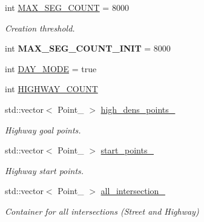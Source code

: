 \begin{DoxyCompactItemize}
\hypertarget{class_entity_container_aa30630d7b19fdf3eca17f07ef0d8ee28}{}\label{class_entity_container_aa30630d7b19fdf3eca17f07ef0d8ee28} 
int \hyperlink{class_entity_container_aa30630d7b19fdf3eca17f07ef0d8ee28}{M\+A\+X\+\_\+\+S\+E\+G\+\_\+\+C\+O\+U\+NT} = 8000
\begin{DoxyCompactList}\small\item\em Creation threshold. \end{DoxyCompactList}\item 
\hypertarget{class_entity_container_ac3fadec692c82ab047c12137e5c3938d}{}\label{class_entity_container_ac3fadec692c82ab047c12137e5c3938d} 
int {\bfseries M\+A\+X\+\_\+\+S\+E\+G\+\_\+\+C\+O\+U\+N\+T\+\_\+\+I\+N\+IT} = 8000
\item 
int \hyperlink{class_entity_container_a903b71e2c4be9c3e1d09f15e43535117}{D\+A\+Y\+\_\+\+M\+O\+DE} = true
\item 
int \hyperlink{class_entity_container_a9e2ee21384cc1ed4a2a74a2dbb57afa2}{H\+I\+G\+H\+W\+A\+Y\+\_\+\+C\+O\+U\+NT}
\item 
\hypertarget{class_entity_container_aef7e8c301071323d9931070e51404705}{}\label{class_entity_container_aef7e8c301071323d9931070e51404705} 
std\+::vector$<$ Point\+\_ $>$ \hyperlink{class_entity_container_aef7e8c301071323d9931070e51404705}{high\+\_\+dens\+\_\+points\+\_\+}
\begin{DoxyCompactList}\small\item\em Highway goal points. \end{DoxyCompactList}\item 
\hypertarget{class_entity_container_a40984f7d116b526a0bb6eeb987df4014}{}\label{class_entity_container_a40984f7d116b526a0bb6eeb987df4014} 
std\+::vector$<$ Point\+\_ $>$ \hyperlink{class_entity_container_a40984f7d116b526a0bb6eeb987df4014}{start\+\_\+points\+\_\+}
\begin{DoxyCompactList}\small\item\em Highway start points. \end{DoxyCompactList}\item 
\hypertarget{class_entity_container_afdce0409c51b6e1886bb96617ce8d004}{}\label{class_entity_container_afdce0409c51b6e1886bb96617ce8d004} 
std\+::vector$<$ Point\+\_ $>$ \hyperlink{class_entity_container_afdce0409c51b6e1886bb96617ce8d004}{all\+\_\+intersection\+\_\+}
\begin{DoxyCompactList}\small\item\em Container for all intersections (Street and Highway) \end{DoxyCompactList}\item 

\end{DoxyCompactItemize}
